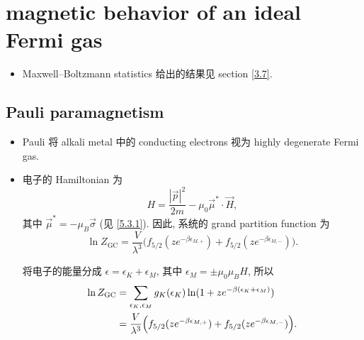 \section{magnetic behavior of an ideal Fermi gas} \label{8.2}
\begin{itemize}
	\item Maxwell--Boltzmann statistics 给出的结果见 section \ref{3.7}.
\end{itemize}

\subsection{Pauli paramagnetism}
\begin{itemize}
	\item Pauli 将 alkali metal 中的 conducting electrons 视为 highly degenerate Fermi gas.
	
	\item 电子的 Hamiltonian 为
	\begin{equation}
		H = \frac{|\vec{p}|^2}{2 m} - \mu_0 \vec{\mu}^* \cdot \vec{H},
	\end{equation}
	其中 $\vec{\mu}^* = - \mu_B \vec{\sigma}$ (见 \eqref{5.3.1}). 因此, 系统的 grand partition function 为
	\begin{equation}
		\ln Z_\text{GC} = \frac{V}{\lambda^3} \Big( f_{5 / 2}(z e^{- \beta \epsilon_{M, +}}) + f_{5 / 2}(z e^{- \beta \epsilon_{M, -}}) \Big).
	\end{equation}
	
	\begin{tcolorbox}[title=calculation:]
		将电子的能量分成 $\epsilon = \epsilon_K + \epsilon_M$, 其中 $\epsilon_M = \pm \mu_0 \mu_B H$, 所以
		\begin{align}
			\ln Z_\text{GC} &= \sum_{\epsilon_K, \epsilon_M} g_K(\epsilon_K) \ln(1 + z e^{- \beta (\epsilon_K + \epsilon_M)}) \notag \\
			&= \frac{V}{\lambda^3} \Big( f_{5 / 2}(z e^{- \beta \epsilon_{M, +}}) + f_{5 / 2}(z e^{- \beta \epsilon_{M, -}}) \Big).
		\end{align}
	\end{tcolorbox}
	

\end{itemize}
